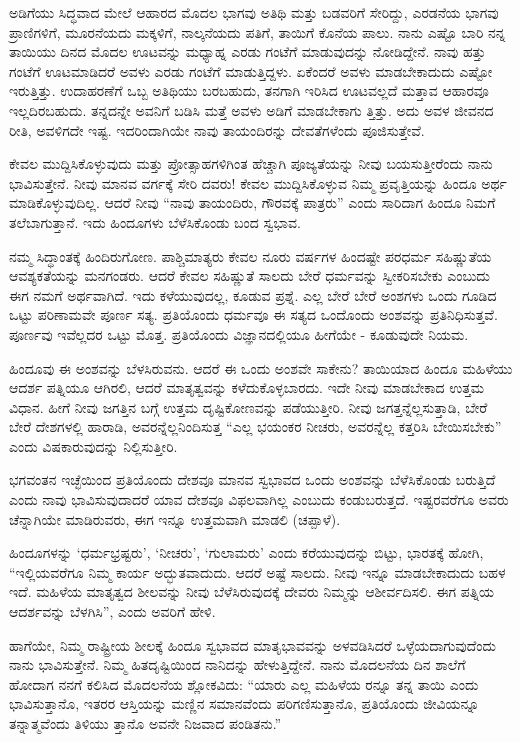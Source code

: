 ಅಡಿಗೆಯು ಸಿದ್ಧವಾದ ಮೇಲೆ ಆಹಾರದ ಮೊದಲ ಭಾಗವು ಅತಿಥಿ ಮತ್ತು ಬಡವರಿಗೆ ಸೇರಿದ್ದು, ಎರಡನೆಯ ಭಾಗವು ಪ್ರಾಣಿಗಳಿಗೆ, ಮೂರನೆಯದು ಮಕ್ಕಳಿಗೆ, ನಾಲ್ಕನೆಯದು ಪತಿಗೆ, ತಾಯಿಗೆ ಕೊನೆಯ ಪಾಲು. ನಾನು ಎಷ್ಟೊ ಬಾರಿ ನನ್ನ ತಾಯಿಯು ದಿನದ ಮೊದಲ ಊಟವನ್ನು ಮಧ್ಯಾಹ್ನ ಎರಡು ಗಂಟೆಗೆ ಮಾಡುವುದನ್ನು ನೋಡಿದ್ದೇನೆ. ನಾವು ಹತ್ತು ಗಂಟೆಗೆ ಊಟಮಾಡಿದರೆ ಅವಳು ಎರಡು ಗಂಟೆಗೆ ಮಾಡುತ್ತಿದ್ದಳು. ಏಕೆಂದರೆ ಅವಳು ಮಾಡಬೇಕಾದುದು ಎಷ್ಟೋ ಇರುತ್ತಿತ್ತು. ಉದಾಹರಣೆಗೆ ಒಬ್ಬ ಅತಿಥಿಯು ಬರಬಹುದು, ತನಗಾಗಿ ಇರಿಸಿದ ಊಟವಲ್ಲದೆ ಮತ್ತಾವ ಆಹಾರವೂ ಇಲ್ಲದಿರಬಹುದು. ತನ್ನದನ್ನೇ ಅವನಿಗೆ ಬಡಿಸಿ ಮತ್ತೆ ಅವಳು ಅಡಿಗೆ ಮಾಡಬೇಕಾಗು ತ್ತಿತ್ತು. ಅದು ಅವಳ ಜೀವನದ ರೀತಿ, ಅವಳಿಗದೇ ಇಷ್ಟ. ಇದರಿಂದಾಗಿಯೇ ನಾವು ತಾಯಂದಿರನ್ನು ದೇವತೆಗಳೆಂದು ಪೂಜಿಸುತ್ತೇವೆ.

ಕೇವಲ ಮುದ್ದಿಸಿಕೊಳ್ಳುವುದು ಮತ್ತು ಪ್ರೋತ್ಸಾಹಗಳಿಗಿಂತ ಹೆಚ್ಚಾಗಿ ಪೂಜ್ಯತೆಯನ್ನು ನೀವು ಬಯಸುತ್ತೀರೆಂದು ನಾನು ಭಾವಿಸುತ್ತೇನೆ. ನೀವು ಮಾನವ ವರ್ಗಕ್ಕೆ ಸೇರಿ ದವರು! ಕೇವಲ ಮುದ್ದಿಸಿಕೊಳ್ಳುವ ನಿಮ್ಮ ಪ್ರವೃತ್ತಿಯನ್ನು ಹಿಂದೂ ಅರ್ಥ ಮಾಡಿಕೊಳ್ಳುವುದಿಲ್ಲ. ಆದರೆ ನೀವು “ನಾವು ತಾಯಂದಿರು, ಗೌರವಕ್ಕೆ ಪಾತ್ರರು” ಎಂದು ಸಾರಿದಾಗ ಹಿಂದೂ ನಿಮಗೆ ತಲೆಬಾಗುತ್ತಾನೆ. ಇದು ಹಿಂದೂಗಳು ಬೆಳೆಸಿಕೊಂಡು ಬಂದ ಸ್ವಭಾವ.

ನಮ್ಮ ಸಿದ್ಧಾಂತಕ್ಕೆ ಹಿಂದಿರುಗೋಣ. ಪಾಶ್ಚಿಮಾತ್ಯರು ಕೇವಲ ನೂರು ವರ್ಷಗಳ ಹಿಂದಷ್ಟೇ ಪರಧರ್ಮ ಸಹಿಷ್ಣುತೆಯ ಆವಶ್ಯಕತೆಯನ್ನು ಮನಗಂಡರು. ಆದರೆ ಕೇವಲ ಸಹಿಷ್ಣುತೆ ಸಾಲದು ಬೇರೆ ಧರ್ಮವನ್ನು ಸ್ವೀಕರಿಸಬೇಕು ಎಂಬುದು ಈಗ ನಮಗೆ ಅರ್ಥವಾಗಿದೆ. ಇದು ಕಳೆಯುವುದಲ್ಲ, ಕೂಡುವ ಪ್ರಶ್ನೆ. ಎಲ್ಲ ಬೇರೆ ಬೇರೆ ಅಂಶಗಳು ಒಂದು ಗೂಡಿದ ಒಟ್ಟು ಪರಿಣಾಮವೇ ಪೂರ್ಣ ಸತ್ಯ. ಪ್ರತಿಯೊಂದು ಧರ್ಮವೂ ಈ ಸತ್ಯದ ಒಂದೊಂದು ಅಂಶವನ್ನು ಪ್ರತಿನಿಧಿಸುತ್ತವೆ. ಪೂರ್ಣವು ಇವೆಲ್ಲದರ ಒಟ್ಟು ಮೊತ್ತ. ಪ್ರತಿಯೊಂದು ವಿಜ್ಞಾನದಲ್ಲಿಯೂ ಹೀಗೆಯೇ - ಕೂಡುವುದೇ ನಿಯಮ.

ಹಿಂದೂವು ಈ ಅಂಶವನ್ನು ಬೆಳಸಿರುವನು. ಆದರೆ ಈ ಒಂದು ಅಂಶವೇ ಸಾಕೇನು? ತಾಯಿಯಾದ ಹಿಂದೂ ಮಹಿಳೆಯು ಆದರ್ಶ ಪತ್ನಿಯೂ ಆಗಿರಲಿ, ಆದರೆ ಮಾತೃತ್ವವನ್ನು ಕಳೆದುಕೊಳ್ಳಬಾರದು. ಇದೇ ನೀವು ಮಾಡಬೇಕಾದ ಉತ್ತಮ ವಿಧಾನ. ಹೀಗೆ ನೀವು ಜಗತ್ತಿನ ಬಗ್ಗೆ ಉತ್ತಮ ದೃಷ್ಟಿಕೋಣವನ್ನು ಪಡೆಯುತ್ತೀರಿ. ನೀವು ಜಗತ್ತನ್ನೆಲ್ಲಸುತ್ತಾಡಿ, ಬೇರೆ ಬೇರೆ ದೇಶಗಳಲ್ಲಿ ಹಾರಾಡಿ, ಅವರನ್ನೆಲ್ಲನಿಂದಿಸುತ್ತ “ಎಲ್ಲ ಭಯಂಕರ ನೀಚರು, ಅವರನ್ನೆಲ್ಲ ಕತ್ತರಿಸಿ ಬೇಯಿಸಬೇಕು” ಎಂದು ವಿಷಕಾರುವುದನ್ನು ನಿಲ್ಲಿಸುತ್ತೀರಿ.

ಭಗವಂತನ ಇಚ್ಛೆಯಿಂದ ಪ್ರತಿಯೊಂದು ದೇಶವೂ ಮಾನವ ಸ್ವಭಾವದ ಒಂದು ಅಂಶವನ್ನು ಬೆಳೆಸಿಕೊಂಡು ಬರುತ್ತಿದೆ ಎಂದು ನಾವು ಭಾವಿಸುವುದಾದರೆ ಯಾವ ದೇಶವೂ ವಿಫಲವಾಗಿಲ್ಲ ಎಂಬುದು ಕಂಡುಬರುತ್ತದೆ. ಇಷ್ಟರವರೆಗೂ ಅವರು ಚೆನ್ನಾಗಿಯೇ ಮಾಡಿರುವರು, ಈಗ ಇನ್ನೂ ಉತ್ತಮವಾಗಿ ಮಾಡಲಿ (ಚಪ್ಪಾಳೆ).

ಹಿಂದೂಗಳನ್ನು ‘ಧರ್ಮಭ್ರಷ್ಟರು’, ‘ನೀಚರು’, ‘ಗುಲಾಮರು’ ಎಂದು ಕರೆಯುವುದನ್ನು ಬಿಟ್ಟು, ಭಾರತಕ್ಕೆ ಹೋಗಿ, “ಇಲ್ಲಿಯವರೆಗೂ ನಿಮ್ಮ ಕಾರ್ಯ ಅದ್ಭುತವಾದುದು. ಆದರೆ ಅಷ್ಟೆ ಸಾಲದು. ನೀವು ಇನ್ನೂ ಮಾಡಬೇಕಾದುದು ಬಹಳ ಇದೆ. ಮಹಿಳೆಯ ಮಾತೃತ್ವದ ಶೀಲವನ್ನು ನೀವು ಬೆಳೆಸಿರುವುದಕ್ಕೆ ದೇವರು ನಿಮ್ಮನ್ನು ಆಶೀರ್ವದಿಸಲಿ. ಈಗ ಪತ್ನಿಯ ಆದರ್ಶವನ್ನು ಬೆಳಗಿಸಿ”, ಎಂದು ಅವರಿಗೆ ಹೇಳಿ.

ಹಾಗೆಯೇ, ನಿಮ್ಮ ರಾಷ್ಟ್ರೀಯ ಶೀಲಕ್ಕೆ ಹಿಂದೂ ಸ್ವಭಾವದ ಮಾತೃಭಾವವನ್ನು ಅಳವಡಿಸಿದರೆ ಒಳ್ಳೆಯದಾಗುವುದೆಂದು ನಾನು ಭಾವಿಸುತ್ತೇನೆ. ನಿಮ್ಮ ಹಿತದೃಷ್ಟಿಯಿಂದ ನಾನಿದನ್ನು ಹೇಳುತ್ತಿದ್ದೇನೆ. ನಾನು ಮೊದಲನೆಯ ದಿನ ಶಾಲೆಗೆ ಹೋದಾಗ ನನಗೆ ಕಲಿಸಿದ ಮೊದಲನೆಯ ಶ್ಲೋಕವಿದು: “ಯಾರು ಎಲ್ಲ ಮಹಿಳೆಯ ರನ್ನೂ ತನ್ನ ತಾಯಿ ಎಂದು ಭಾವಿಸುತ್ತಾನೊ, ಇತರರ ಆಸ್ತಿಯನ್ನು ಮಣ್ಣಿನ ಸಮಾನವೆಂದು ಪರಿಗಣಿಸುತ್ತಾನೊ, ಪ್ರತಿಯೊಂದು ಜೀವಿಯನ್ನೂ ತನ್ನಾತ್ಮವೆಂದು ತಿಳಿಯು ತ್ತಾನೊ ಅವನೇ ನಿಜವಾದ ಪಂಡಿತನು.”

